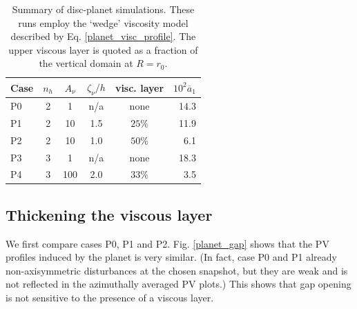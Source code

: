
\begin{table}
  \centering
  \caption{Summary of disc-planet simulations. These runs employ the
    `wedge' viscosity model described by
    Eq. \ref{planet_visc_profile}. The upper viscous layer is
    quoted as a fraction of the vertical domain at 
    $R=r_0$. \label{planet_sims}}  
    \begin{tabular}{lccccr}
      \hline\hline
      Case & $n_h$ & $A_\nu$ &$\zeta_\nu/h$ & visc. layer& $10^2\overline{a}_1$ \\ 
      \hline
      P0 &  2     &    1    &    n/a      & none     &   14.3    \\%
      P1 &  2     &    10   &    1.5      & $25\%$  &    11.9     \\ 
      P2 &  2     &    10   &    1.0      & $50\%$  &    6.1      \\
      P3 &  3     &    1    &     n/a      & none  &     18.3   \\
      P4 &  3     &    100   &    2.0      & $33\%$ &     3.5    \\
      \hline
  \end{tabular}
\end{table}

\subsection{Thickening the viscous layer}
We first compare cases P0, P1 and P2. Fig. \ref{planet_gap} 
shows that the PV profiles induced by the planet is very
similar. (In fact, case P0 and P1 already non-axisymmetric
disturbances at the chosen snapshot, but they are weak and is not
reflected in the azimuthally averaged PV plots.) This shows that gap
opening is not sensitive to the presence of a viscous layer.  

